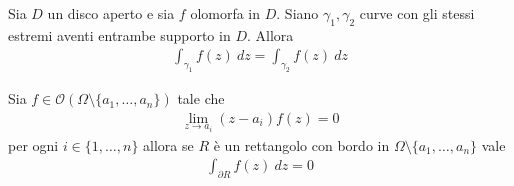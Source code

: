 \begin{corollary}
	Sia $D$ un disco aperto e sia $f$ olomorfa in $D$. Siano $\gamma_1, \gamma_2$ curve con gli stessi estremi aventi entrambe supporto in $D$. Allora
	\begin{equation*}
	\begin{aligned}	
		\int_{\gamma_1} f(z) \ dz = \int_{\gamma_2} f(z) \ dz
	\end{aligned}
	\end{equation*}
\end{corollary}

\begin{theorem}
	\label{thr:goursat-con-singolarità}
	Sia $f \in \mathcal{O}(\Omega \setminus \{a_1, \dots, a_n\})$ tale che
	\begin{equation*}
	\begin{aligned}
		\lim_{z\to a_i} (z-a_i)f(z) = 0
	\end{aligned}
	\end{equation*}
	per ogni $i \in \{1, \dots, n\}$ allora se $R$ è un rettangolo con bordo in $\Omega \setminus  \{a_1, \dots, a_n\}$ vale
	\begin{equation*}
	\begin{aligned}
		\int_{\partial R} f(z)\ dz = 0
	\end{aligned}
	\end{equation*}
\end{theorem}
